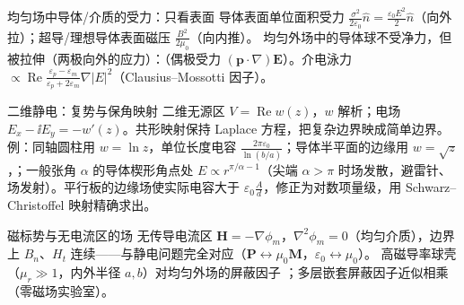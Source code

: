 \begin{结论}{均匀场中导体/介质的受力：只看表面}
导体表面单位面积受力 $\frac{\sigma^2}{2\varepsilon_0}\hat n=\frac{\varepsilon_0E^2}{2}\hat n$（向外拉）；超导/理想导体表面磁压 $\frac{B^2}{2\mu_0}$（向内推）。
均匀外场中的导体球不受净力，但被拉伸（两极向外的应力）：（偶极受力 $(\mathbf p\cdot\nabla)\mathbf E$）。介电泳力 $\propto\operatorname{Re}\frac{\varepsilon_p-\varepsilon_m}{\varepsilon_p+2\varepsilon_m}\nabla|E|^2$（Clausius--Mossotti 因子）。
\end{结论}

\begin{结论}{二维静电：复势与保角映射}
二维无源区 $V=\operatorname{Re}w(z)$，$w$ 解析；电场 $E_x-\ii E_y=-w'(z)$。共形映射保持 Laplace 方程，把复杂边界映成简单边界。
例：同轴圆柱用 $w=\ln z$，单位长度电容 $\frac{2\pi\varepsilon_0}{\ln(b/a)}$；导体半平面的边缘用 $w=\sqrt z$，；一般张角 $\alpha$ 的导体楔形角点处 $E\propto r^{\pi/\alpha-1}$（尖端 $\alpha>\pi$ 时场发散，避雷针、场发射）。平行板的边缘场使实际电容大于 $\varepsilon_0\frac{A}{d}$，修正为对数项量级，用 Schwarz--Christoffel 映射精确求出。
\end{结论}

\begin{结论}{磁标势与无电流区的场}
无传导电流区 $\mathbf H=-\nabla\phi_m$，$\nabla^2\phi_m=0$（均匀介质），边界上 $B_n$、$H_t$ 连续——与静电问题完全对应（$\mathbf P\leftrightarrow\mu_0\mathbf M$，$\varepsilon_0\leftrightarrow\mu_0$）。
高磁导率球壳（$\mu_r\gg1$，内外半径 $a,b$）对均匀外场的屏蔽因子 ；多层嵌套屏蔽因子近似相乘（零磁场实验室）。
\end{结论}

